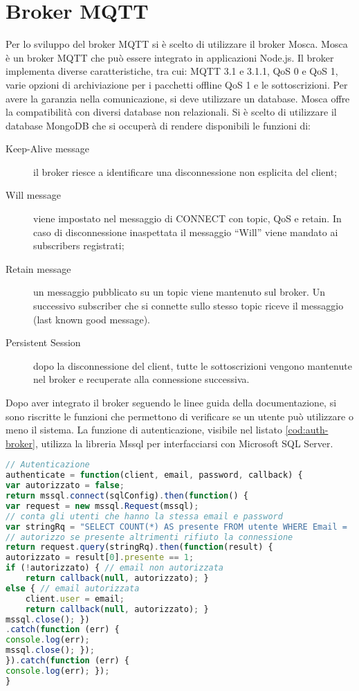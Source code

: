 \section{Broker MQTT}
Per lo sviluppo del broker MQTT si è scelto di utilizzare il broker Mosca. Mosca \cite{mosca:site} è un broker MQTT che può essere integrato in applicazioni Node.js. Il broker implementa diverse caratteristiche, tra cui: MQTT 3.1 e 3.1.1, QoS 0 e QoS 1, varie opzioni di archiviazione per i pacchetti offline QoS 1 e le sottoscrizioni. Per avere la garanzia nella comunicazione, si deve utilizzare un database. Mosca offre la compatibilità con diversi database non relazionali. Si è scelto di utilizzare il database MongoDB che si occuperà di rendere disponibili le funzioni di:
\begin{description}
	
	\item[Keep-Alive message] il broker riesce a identificare una disconnessione non esplicita del client;
	
	\item[Will message] viene impostato nel messaggio di CONNECT con topic, QoS e retain. In caso di disconnessione inaspettata il messaggio ``Will'' viene mandato ai subscribers registrati;
	
	\item[Retain message] un messaggio pubblicato su un topic viene mantenuto sul broker. Un successivo subscriber che si connette sullo stesso topic riceve il messaggio (last known good message).
	
	\item[Persistent Session] dopo la disconnessione del client, tutte le sottoscrizioni vengono mantenute nel broker e recuperate alla connessione successiva.
	
\end{description}
Dopo aver integrato il broker seguendo le linee guida della documentazione, si sono riscritte le funzioni che permettono di verificare se un utente può utilizzare o meno il sistema. La funzione di autenticazione, visibile nel listato \ref{cod:auth-broker}, utilizza la libreria Mssql per interfacciarsi con Microsoft SQL Server.
\begin{lstlisting}[language=JavaScript, label=cod:auth-broker, caption=Funzione di autenticazione del broker MQTT]
// Autenticazione
authenticate = function(client, email, password, callback) {
var autorizzato = false;
return mssql.connect(sqlConfig).then(function() {
var request = new mssql.Request(mssql);
// conta gli utenti che hanno la stessa email e password
var stringRq = "SELECT COUNT(*) AS presente FROM utente WHERE Email = '" + email + "' AND Password = '" + password + "';";
// autorizzo se presente altrimenti rifiuto la connessione
return request.query(stringRq).then(function(result) {
autorizzato = result[0].presente == 1;
if (!autorizzato) { // email non autorizzata
	return callback(null, autorizzato); }
else { // email autorizzata
	client.user = email;
	return callback(null, autorizzato); }
mssql.close(); })
.catch(function (err) {
console.log(err);
mssql.close(); });
}).catch(function (err) {
console.log(err); });
}
\end{lstlisting}

